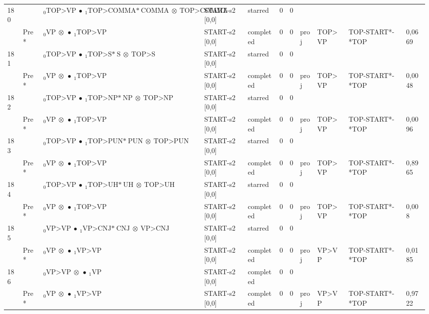 \documentclass[10pt]{article}
\begin{document}
\begin{longtable}[htbp]{lllllllllll}
180 & & $ {}_0 \textrm{TOP>VP} \  \bullet \ {}_{1} \textrm{TOP>COMMA*} \ \textrm{COMMA} \  \otimes \ \textrm{TOP>COMMA} $ & START-s2 [0,0] & starred & 0 & 0 & & & & \\ 
 & Pre *& $ {}_0 \textrm{VP} \  \otimes \  \bullet \ {}_{1} \textrm{TOP>VP} $ & START-s2 [0,0] & completed & 0 & 0 & proj & TOP>VP & TOP-START*-*TOP & 0,0669 \\ 
181 & & $ {}_0 \textrm{TOP>VP} \  \bullet \ {}_{1} \textrm{TOP>S*} \ \textrm{S} \  \otimes \ \textrm{TOP>S} $ & START-s2 [0,0] & starred & 0 & 0 & & & & \\ 
 & Pre *& $ {}_0 \textrm{VP} \  \otimes \  \bullet \ {}_{1} \textrm{TOP>VP} $ & START-s2 [0,0] & completed & 0 & 0 & proj & TOP>VP & TOP-START*-*TOP & 0,0048 \\ 
182 & & $ {}_0 \textrm{TOP>VP} \  \bullet \ {}_{1} \textrm{TOP>NP*} \ \textrm{NP} \  \otimes \ \textrm{TOP>NP} $ & START-s2 [0,0] & starred & 0 & 0 & & & & \\ 
 & Pre *& $ {}_0 \textrm{VP} \  \otimes \  \bullet \ {}_{1} \textrm{TOP>VP} $ & START-s2 [0,0] & completed & 0 & 0 & proj & TOP>VP & TOP-START*-*TOP & 0,0096 \\ 
183 & & $ {}_0 \textrm{TOP>VP} \  \bullet \ {}_{1} \textrm{TOP>PUN*} \ \textrm{PUN} \  \otimes \ \textrm{TOP>PUN} $ & START-s2 [0,0] & starred & 0 & 0 & & & & \\ 
 & Pre *& $ {}_0 \textrm{VP} \  \otimes \  \bullet \ {}_{1} \textrm{TOP>VP} $ & START-s2 [0,0] & completed & 0 & 0 & proj & TOP>VP & TOP-START*-*TOP & 0,8965 \\ 
184 & & $ {}_0 \textrm{TOP>VP} \  \bullet \ {}_{1} \textrm{TOP>UH*} \ \textrm{UH} \  \otimes \ \textrm{TOP>UH} $ & START-s2 [0,0] & starred & 0 & 0 & & & & \\ 
 & Pre *& $ {}_0 \textrm{VP} \  \otimes \  \bullet \ {}_{1} \textrm{TOP>VP} $ & START-s2 [0,0] & completed & 0 & 0 & proj & TOP>VP & TOP-START*-*TOP & 0,008 \\ 
185 & & $ {}_0 \textrm{VP>VP} \  \bullet \ {}_{1} \textrm{VP>CNJ*} \ \textrm{CNJ} \  \otimes \ \textrm{VP>CNJ} $ & START-s2 [0,0] & starred & 0 & 0 & & & & \\ 
 & Pre *& $ {}_0 \textrm{VP} \  \otimes \  \bullet \ {}_{1} \textrm{VP>VP} $ & START-s2 [0,0] & completed & 0 & 0 & proj & VP>VP & TOP-START*-*TOP & 0,0185 \\ 
186 & & $ {}_0 \textrm{VP>VP} \  \otimes \  \bullet \ {}_{1} \textrm{VP} $ & START-s2 [0,0] & completed & 0 & 0 & & & & \\ 
 & Pre *& $ {}_0 \textrm{VP} \  \otimes \  \bullet \ {}_{1} \textrm{VP>VP} $ & START-s2 [0,0] & completed & 0 & 0 & proj & VP>VP & TOP-START*-*TOP & 0,9722 \\ 

\end{longtable}
\end{document}
